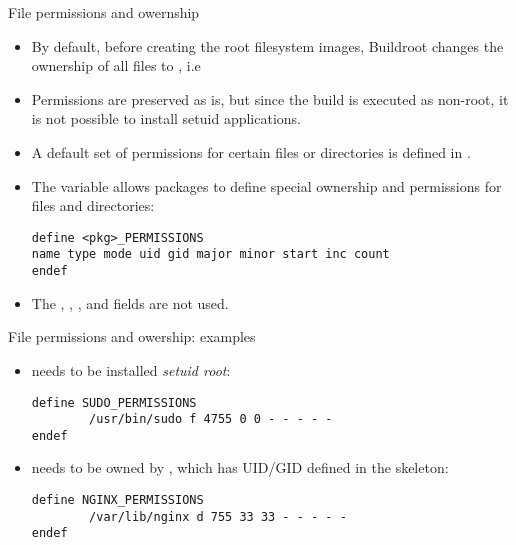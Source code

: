 \begin{frame}[fragile]{File permissions and owernship}

\begin{itemize}

\item By default, before creating the root filesystem images,
  Buildroot changes the ownership of all files to , i.e
\item Permissions are preserved as is, but since the build is executed
  as non-root, it is not possible to install setuid applications.
\item A default set of permissions for certain files or directories is
  defined in .
\item The  variable allows packages to define
  special ownership and permissions for files and directories:
{\small
  \begin{block}{}
\begin{verbatim}
define <pkg>_PERMISSIONS
name type mode uid gid major minor start inc count
endef
\end{verbatim}
  \end{block}}
\item The , , ,  and
   fields are not used.

\end{itemize}

\end{frame}

\begin{frame}[fragile]{File permissions and owership: examples}

  \begin{itemize}
  \item {} needs to be installed {\em setuid root}:
  \begin{block}{}
    \begin{verbatim}
define SUDO_PERMISSIONS
        /usr/bin/sudo f 4755 0 0 - - - - -
endef
\end{verbatim}
\end{block}

\item {} needs to be owned by ,
  which has UID/GID  defined in the skeleton:

\begin{block}{}
  \begin{verbatim}
define NGINX_PERMISSIONS
        /var/lib/nginx d 755 33 33 - - - - -
endef
\end{verbatim}
\end{block}

\end{itemize}

\end{frame}

